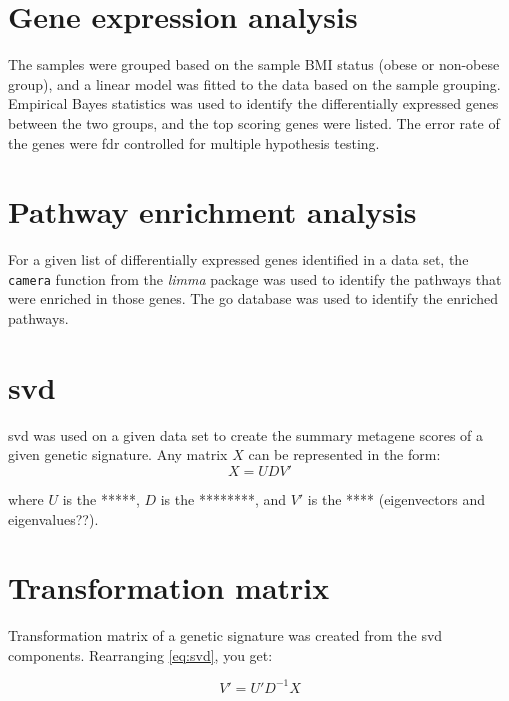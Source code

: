 \section{Gene expression analysis}
\label{sec:gene_expression_analysis}

The samples were grouped based on the sample BMI status (obese or non-obese group), and a linear model was fitted to the data based on the sample grouping.
Empirical Bayes statistics was used to identify the differentially expressed genes between the two groups, and the top scoring genes were listed.
The error rate of the genes were \gls{fdr} controlled for multiple hypothesis testing.

\section{Pathway enrichment analysis}
\label{sec:pathway_enrichment_analysis}

For a given list of differentially expressed genes identified in a data set, the \texttt{camera} function from the \textit{limma} package was used to identify the pathways that were enriched in those genes.
The \gls{go} database was used to identify the enriched pathways.

\section{\gls{svd}}
\label{sec:singular_value_decomposition}

\gls{svd} was used on a given data set to create the summary metagene scores of a given genetic signature.
Any matrix $X$ can be represented in the form:
\begin{equation}
	\label{eq:svd}
	X = UDV'
\end{equation}

\noindent
where $U$ is the *****, $D$ is the ********, and $V'$ is the **** (eigenvectors and eigenvalues??).

\section{Transformation matrix}
\label{sec:transformation_matrix}

Transformation matrix of a genetic signature was created from the \gls{svd} components.
Rearranging \cref{eq:svd}, you get:

\begin{equation}
	\label{eq:transmat}
	V' = U'D^{-1}X
\end{equation}

